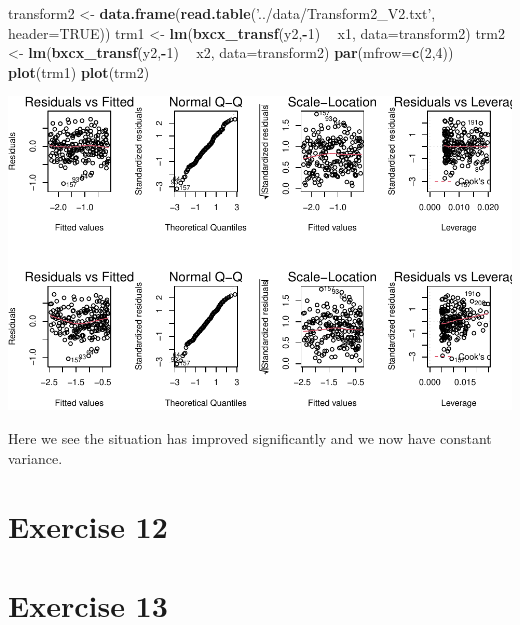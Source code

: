 \documentclass[]{article}
\newenvironment{Shaded}{\begin{snugshade}}{\end{snugshade}}
\newcommand{\DataTypeTok}[1]{\textcolor[rgb]{0.13,0.29,0.53}{#1}}
\newcommand{\DecValTok}[1]{\textcolor[rgb]{0.00,0.00,0.81}{#1}}
\newcommand{\KeywordTok}[1]{\textcolor[rgb]{0.13,0.29,0.53}{\textbf{#1}}}
\newcommand{\NormalTok}[1]{#1}
\newcommand{\OperatorTok}[1]{\textcolor[rgb]{0.81,0.36,0.00}{\textbf{#1}}}
\newcommand{\OtherTok}[1]{\textcolor[rgb]{0.56,0.35,0.01}{#1}}
\newcommand{\StringTok}[1]{\textcolor[rgb]{0.31,0.60,0.02}{#1}}
\begin{document}
\begin{Shaded}
\begin{Highlighting}[]
\NormalTok{transform2 <-}\StringTok{ }\KeywordTok{data.frame}\NormalTok{(}\KeywordTok{read.table}\NormalTok{(}\StringTok{'../data/Transform2_V2.txt'}\NormalTok{, }\DataTypeTok{header=}\OtherTok{TRUE}\NormalTok{))}
\NormalTok{trm1 <-}\StringTok{ }\KeywordTok{lm}\NormalTok{(}\KeywordTok{bxcx_transf}\NormalTok{(y2,}\OperatorTok{-}\DecValTok{1}\NormalTok{) }\OperatorTok{~}\StringTok{ }\NormalTok{x1, }\DataTypeTok{data=}\NormalTok{transform2)}
\NormalTok{trm2 <-}\StringTok{ }\KeywordTok{lm}\NormalTok{(}\KeywordTok{bxcx_transf}\NormalTok{(y2,}\OperatorTok{-}\DecValTok{1}\NormalTok{) }\OperatorTok{~}\StringTok{ }\NormalTok{x2, }\DataTypeTok{data=}\NormalTok{transform2)}
\KeywordTok{par}\NormalTok{(}\DataTypeTok{mfrow=}\KeywordTok{c}\NormalTok{(}\DecValTok{2}\NormalTok{,}\DecValTok{4}\NormalTok{))}
\KeywordTok{plot}\NormalTok{(trm1)}
\KeywordTok{plot}\NormalTok{(trm2)}
\end{Highlighting}
\end{Shaded}

\includegraphics{./figures/unnamed-chunk-26-1.pdf}

Here we see the situation has improved significantly and we now have
constant variance.

\newpage

\hypertarget{exercise-12}{%
\section{Exercise 12}\label{exercise-12}}

\newpage

\hypertarget{exercise-13}{%
\section{Exercise 13}\label{exercise-13}}
\end{document}
